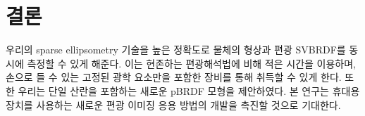 \documentclass[a4paper,twocolumn]{article}
\begin{document}
\section{결론}
\label{sec:conclusion}

우리의 sparse ellipsometry 기술을 높은 정확도로 물체의 형상과 편광 SVBRDF를 동시에 측정할 수 있게 해준다. 이는 현존하는 편광해석법에 비해 적은 시간을 이용하며, 손으로 들 수 있는 고정된 광학 요소만을 포함한 장비를 통해 취득할 수 있게 한다. 또한 우리는 단일 산란을 포함하는 새로운 pBRDF 모형을 제안하였다. 본 연구는 휴대용 장치를 사용하는 새로운  편광 이미징 응용 방법의 개발을 촉진할 것으로 기대한다. 

%



\nocite{*}


\end{document}
